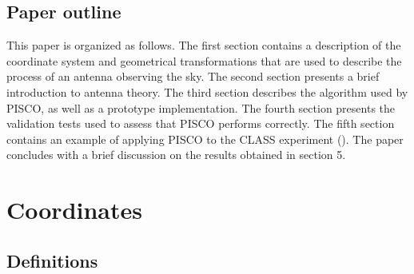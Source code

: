 \documentclass[a4paper,fleqn]{cas-dc}\sloppy
\begin{document}
\subsection{Paper outline}

This paper is organized as follows. The first section contains a description of the coordinate system and geometrical transformations that are used to describe the process of an antenna observing the sky. The second section presents a brief introduction to antenna theory. The third section describes the algorithm used by PISCO, as well as a prototype implementation. The fourth section presents the validation tests used to assess that PISCO performs correctly. The fifth section contains an example of applying PISCO to the CLASS experiment (\cite{2016SPIE.9914E..1KH}). The paper concludes with a brief discussion on the results obtained in section 5.

%
\section{Coordinates}
\label{sec::coordinate-systems}

\subsection{Definitions}
\end{document}

